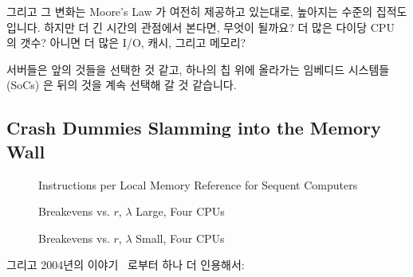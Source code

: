 그리고 그 변화는 Moore's Law 가 여전히 제공하고 있는대로, 높아지는 수준의
집적도입니다.
하지만 더 긴 시간의 관점에서 본다면, 무엇이 될까요?
더 많은 다이당 CPU 의 갯수?
아니면 더 많은 I/O, 캐시, 그리고 메모리?

서버들은 앞의 것들을 선택한 것 같고, 하나의 칩 위에 올라가는 임베디드 시스템들
(SoCs) 은 뒤의 것을 계속 선택해 갈 것 같습니다.

\subsection{Crash Dummies Slamming into the Memory Wall}
\label{sec:future:Crash Dummies Slamming into the Memory Wall}

\begin{figure}[tbp]
\centering
\epsfxsize=3in
\caption{Instructions per Local Memory Reference for Sequent Computers}
\label{fig:future:Instructions per Local Memory Reference for Sequent Computers}
\end{figure}

\begin{figure}[htbp]
\centering
\epsfxsize=3in
\caption{Breakevens vs. $r$, $\lambda$ Large, Four CPUs}
\label{fig:future:Breakevens vs. r, lambda Large, Four CPUs}
\end{figure}

\begin{figure}[htbp]
\centering
\epsfxsize=3in
\caption{Breakevens vs. $r$, $\lambda$ Small, Four CPUs}
\label{fig:future:Breakevens vs. r, Worst-Case lambda, Four CPUs}
\end{figure}

그리고 2004년의 이야기~\cite{PaulEdwardMcKenneyPhD} 로부터 하나 더 인용해서:

